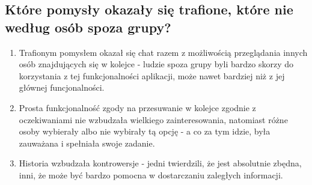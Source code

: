 \documentclass[12pt]{article}
\begin{document}
\subsection{Które pomysły okazały się trafione, które nie według osób spoza grupy?}
\begin{enumerate}
	\item Trafionym pomysłem okazał się chat razem z możliwością przeglądania innych osób znajdujących się w kolejce - ludzie spoza grupy byli bardzo skorzy do korzystania z tej funkcjonalności aplikacji, może nawet bardziej niż z jej głównej funcjonalności.
	\item Prosta funkcjonalność zgody na przesuwanie w kolejce zgodnie z oczekiwaniami nie wzbudzała wielkiego zainteresowania, natomiast różne osoby wybierały albo nie wybirały tą opcję - a co za tym idzie, była zauważana i spełniała swoje zadanie.
	\item Historia wzbudzała kontrowersje - jedni twierdzili, że jest absolutnie zbędna, inni, że może być bardzo pomocna w dostarczaniu zaległych informacji.
\end{enumerate}


\clearpage
\end{document}
